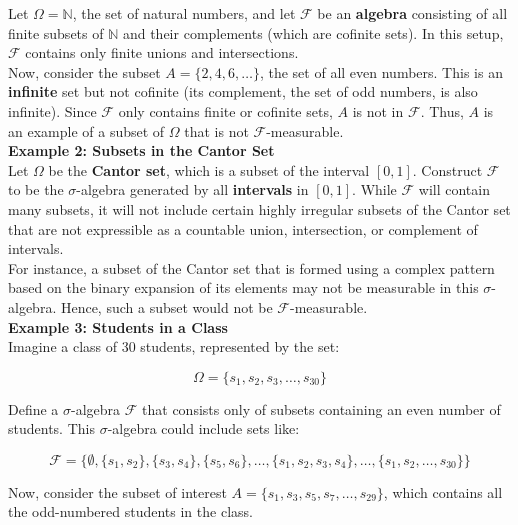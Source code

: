 Let $\Omega = \mathbb{N}$, the set of natural numbers, and let $\mathcal{F}$ be an \textbf{algebra} consisting of all finite subsets of $\mathbb{N}$ and their complements (which are cofinite sets). In this setup, $\mathcal{F}$ contains only finite unions and intersections.\\

Now, consider the subset $A = \{2, 4, 6, \ldots\}$, the set of all even numbers. This is an \textbf{infinite} set but not cofinite (its complement, the set of odd numbers, is also infinite). Since $\mathcal{F}$ only contains finite or cofinite sets, $A$ is not in $\mathcal{F}$. Thus, $A$ is an example of a subset of $\Omega$ that is not $\mathcal{F}$-measurable.\\

\textbf{Example 2: Subsets in the Cantor Set}\\

Let $\Omega$ be the \textbf{Cantor set}, which is a subset of the interval $[0, 1]$. Construct $\mathcal{F}$ to be the $\sigma$-algebra generated by all \textbf{intervals} in $[0, 1]$. While $\mathcal{F}$ will contain many subsets, it will not include certain highly irregular subsets of the Cantor set that are not expressible as a countable union, intersection, or complement of intervals.\\

For instance, a subset of the Cantor set that is formed using a complex pattern based on the binary expansion of its elements may not be measurable in this $\sigma$-algebra. Hence, such a subset would not be $\mathcal{F}$-measurable.\\

\textbf{Example 3: Students in a Class}\\

Imagine a class of 30 students, represented by the set:

\[
\Omega = \{s_1, s_2, s_3, \ldots, s_{30}\}
\]

Define a \( \sigma \)-algebra \( \mathcal{F} \) that consists only of subsets containing an even number of students. This \( \sigma \)-algebra could include sets like:

\[
\mathcal{F} = \{\emptyset, \{s_1, s_2\}, \{s_3, s_4\}, \{s_5, s_6\}, \ldots, \{s_1, s_2, s_3, s_4\}, \ldots, \{s_1, s_2, \ldots, s_{30}\}\}
\]

Now, consider the subset of interest \( A = \{s_1, s_3, s_5, s_7, \ldots, s_{29}\} \), which contains all the odd-numbered students in the class.\\

